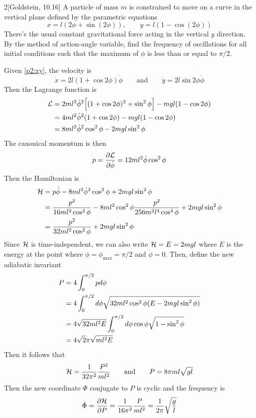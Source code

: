 \documentclass[12pt]{article}
\begin{document}
\begin{problem}{2}[Goldstein, 10.16]
A particle of mass $m$ is constrained to move on a curve in the vertical plane
defined by the parametric equations
\begin{equation}\label{p2:xy}
    x=l(2\phi+\sin(2\phi)),\qquad
    y=l(1-\cos(2\phi))
\end{equation}
There's the usual constant gravitational force acting in the vertical $y$
direction. By the method of action-angle variable, find the frequency of
oscillations for all initial conditions such that the maximum of $\phi$ is less
than or equal to $\pi/2$.
\begin{solution}
Given \eqref{p2:xy}, the velocity is
\begin{equation}
    \dot{x}=2l(1+\cos2\phi)\dot\phi\qquad\text{and}\qquad
    \dot{y}=2l\sin2\phi \dot\phi
\end{equation}
Then the Lagrange function is
\begin{align}
    \mathcal{L}&=2ml^2\dot\phi^2\qty[(1+\cos2\phi)^2+\sin^2\phi]-mgl(1-\cos2\phi)\notag\\
       &=4ml^2\dot\phi^2\qty(1+\cos2\phi)-mgl(1-\cos2\phi)\notag\\
       &=8ml^2\dot\phi^2\cos^2\phi-2mgl\sin^2\phi
\end{align}
The canonical momentum is then
\begin{equation}
    p=\frac{\partial\mathcal{L}}{\partial\dot\phi}=12ml^2\dot\phi\cos^2\phi 
\end{equation}
Then the Hamiltonian is
\begin{align}
    \mathcal{H}
    &=p\dot\phi-8ml^2\dot\phi^2\cos^2\phi+2mgl\sin^2\phi\notag\\
    &=\frac{p^2}{16ml^2\cos^2\phi}-8ml^2\cos^2\phi\frac{p^2}{256m^2l^4\cos^4\phi}+2mgl\sin^2\phi\notag\\
    &=\frac{p^2}{32ml^2\cos^2\phi}+2mgl\sin^2\phi
\end{align}
Since $\mathcal{H}$ is time-independent, we can also write $\mathcal{H}=E=2mgl$ where $E$ is the
energy at the point where $\phi=\phi_{\max}=\pi/2$ and $\dot\phi=0$. Then,
define the new adiabatic invariant
\begin{align}
    P&=4\int_0^{\pi/2} pd\phi\notag\\
     &=4\int_0^{\pi/2} d\phi\sqrt{32ml^2\cos^2\phi(E-2mgl\sin^2\phi)}\notag\\
     &=4\sqrt{32ml^2E}\int_0^{\pi/2}d\phi\cos\phi\sqrt{1-\sin^2\phi}\notag\\
     &=4\sqrt2\pi\sqrt{ml^2E}
\end{align}
Then it follows that
\begin{equation}
    \mathcal{H}=\frac1{32\pi^2}\frac{P^2}{ml^2}\qquad\text{and}\qquad
    P=8\pi ml\sqrt{gl}
\end{equation}
Then the new coordinate $\Phi$ conjugate to $P$ is cyclic and the frequency is
\begin{equation}
    \dot\Phi=\frac{\partial\mathcal{H}}{\partial P} 
    =\frac1{16\pi^2}\frac{P}{ml^2}=\frac1{2\pi}\sqrt{\frac{g}{l}}
\end{equation}
\end{solution}
\end{problem}
\end{document}
